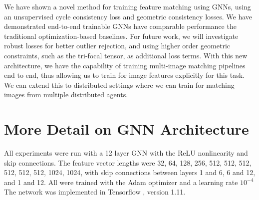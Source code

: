 \documentclass{article} %
\begin{document}
We have shown a novel method for training feature matching using GNNs, using an unsupervised cycle consistency loss and geometric consistency losses.
We have demonstrated end-to-end trainable GNNs have comparable performance the traditional optimization-based baselines.
For future work, we will investigate robust losses for better outlier rejection, and using higher order geometric constraints, such as the tri-focal tensor, as additional loss terms.
With this new architecture, we have the capability of training multi-image matching pipelines end to end, thus allowing us to train for image features explicitly for this task.
We can extend this to distributed settings where we can train for matching images from multiple distributed agents. 

% 





\appendix
\section{More Detail on GNN Architecture}
All experiments were run with a 12 layer GNN with the ReLU nonlinearity and skip connections.
The feature vector lengths were 32, 64, 128, 256, 512, 512, 512, 512, 512, 512, 1024, 1024, with skip connections between layers 1 and 6, 6 and 12, and 1 and 12.
All were trained with the Adam optimizer \citep{kingma2014adam} and a learning rate $10^{-4}$
The network was implemented in Tensorflow \citep{tensorflow2015}, version 1.11.
\end{document}
